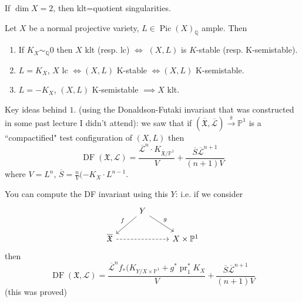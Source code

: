 \begin{remark}\leavevmode
If \(\dim X=2\), then klt=quotient singularities.
\end{remark}

\begin{thm}[Odaka '12, '13]\leavevmode
Let \(X\) be a normal projective variety, \(L \in \operatorname{Pic}(X)_\mathbb{Q}\) ample. Then
\begin{enumerate}
\item  If \(K_X \sim_\mathbb{Q} 0\) then \(X\) klt (resp. lc) \(\iff\) \((X,L)\) is \(K\)-stable (resp. K-semistable).
\item \(L=K_X\), \(X\) lc \(\iff (X,L)\) K-stable \(\iff (X,L)\) K-semistable.
\item \(L=-K_X\), \((X,L)\) K-semistable \(\implies  X\) klt.
\end{enumerate}
\end{thm}

Key ideas behind \(1.\) (using the Donaldson-Futaki invariant that was constructed in some past lecture I didn't attend): we saw that if \((\overline{\mathfrak{X}},\overline{\mathcal{L}}) \xrightarrow{\overline{\pi}} \mathbb{P}^1\) is a ``compactified" test configuration of \((X,L)\) then
\[\operatorname{D F}(\mathfrak{X},\mathcal{L}) = \frac{\overline{\mathcal{L}}^n\cdot K_{\overline{\mathfrak{X}}/\mathbb{P}^1}}{V}+\frac{\overline{S}\overline{\mathcal{L}}^{n+1}}{(n+1)V}\]
where \(V=L^n\), \(\overline{S}=\frac{n}{V}(-K_X\cdot L^{n-1}\).

\begin{remark}\leavevmode
You can compute the DF invariant using this \(Y\): i.e. if we consider
\[\begin{tikzcd}
&Y\arrow[dl,"f",swap]\arrow[dr,"g"]\\
\overline{\mathfrak{X}}\arrow[rr,dashed]&&X\times \mathbb{P}^1
\end{tikzcd}\]
then
\[\operatorname{DF}(\mathfrak{X},\mathcal{L})=\frac{\overline{\mathcal{L}}^nf_*(K_{Y/X \times \mathbb{P}^1}+g^* \operatorname{pr}_1^*K_X}{V}+\frac{\overline{S}\overline{\mathcal{L}}^{n+1}}{(n+1)V}\]
(this was proved)
\end{remark}

